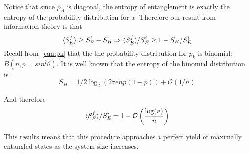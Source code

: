 Notice that since $\rho_A$ is diagonal, the entropy of entanglement is exactly the entropy of the probability distribution for $x$.
Therefore our result from information theory is that
$$
{\langle S_E^f \rangle} \ge S_E^i - S_H \Rightarrow {\langle S_E^f \rangle} / S_E^i \ge 1 - S_H /S_E^i 
$$
Recall from~\eqref{eqn:pk} that the the probability distribution for $p_k$ is binomial: $B(n, p=sin^2\theta)$.
It is well known that the entropy of the binomial distribution is
$$S_H = 1/2 \log_2 \left(2 \pi e n p (1-p)\right) + \mathcal{O}(1/n)$$

And therefore 
$$
{\langle S_E^f \rangle} / S_E^i = 1 - \mathcal{O}\left(\frac{\log(n)}{n}\right)
$$

This results means that this procedure approaches a perfect yield of maximally entangled states as the system size increases.